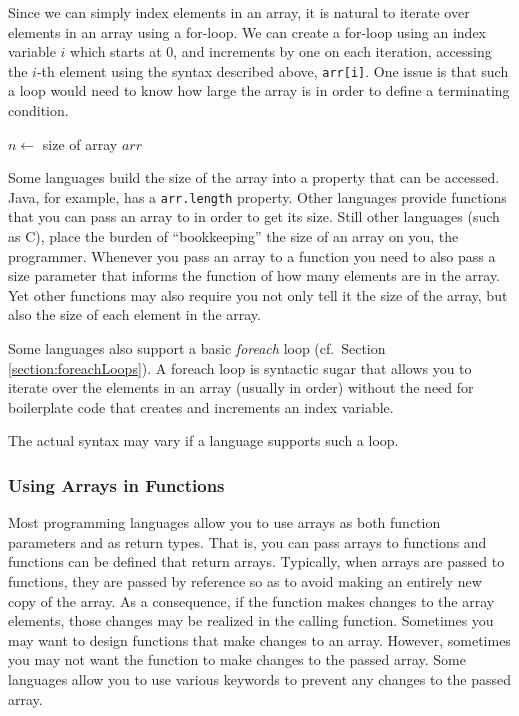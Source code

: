 Since we can simply index elements in an array, it is natural to
iterate over elements in an array using a for-loop.  We can create
a for-loop using an index variable $i$ which starts at 0, and increments
by one on each iteration, accessing the $i$-th element using the
syntax described above, \texttt{arr[i]}.  One issue is that
such a loop would need to know how large the array is in order
to define a terminating condition.  

\begin{algorithm}
$n \leftarrow$ size of array $arr$ \;
\end{algorithm}

Some languages build the size of the array into a property that 
can be accessed.  Java, for example, has a \texttt{arr.length} 
property.  Other languages provide functions that you can pass an
array to in order to get its size.  Still other languages (such as C), 
place the burden of ``bookkeeping'' the size of an array on you, the
programmer.  Whenever you pass an array to a function you need
to also pass a size parameter that informs the function of how many
elements are in the array.  Yet other functions may also require you
not only tell it the size of the array, but also the size of each element
in the array.


Some languages also support a basic \emph{foreach} loop (cf.\ 
Section \ref{section:foreachLoops}).  A foreach loop is 
\gls{syntactic sugar} that allows you to iterate over the elements 
in an array (usually in order) without the need for boilerplate code 
that creates and increments an index variable.

\begin{algorithm}
\end{algorithm}

The actual syntax may vary if a language supports such a loop.

\subsubsection{Using Arrays in Functions}

Most programming languages allow you to use arrays as both function 
parameters and as return types.  That is, you can pass arrays to
functions and functions can be defined that return arrays.  Typically, 
when arrays are passed to functions, they are passed by reference
so as to avoid making an entirely new copy of the array.  As a 
consequence, if the function makes changes to the array elements, 
those changes may be realized in the calling function.  Sometimes 
you may want to design functions that make changes to an array.  
However, sometimes you may not want the function to make
changes to the passed array.  Some languages allow you to use 
various keywords to prevent any changes to the passed array.

